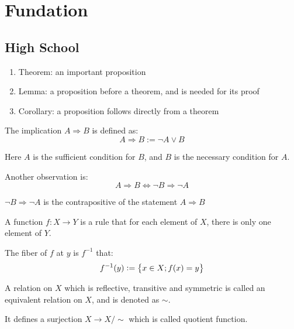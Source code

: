 \chapter{Fundation}

\section{High School}

\begin{enumerate}
    \item Theorem: an important proposition
    \item Lemma: a proposition before a theorem, and is needed for its proof
    \item Corollary: a proposition follows directly from a theorem
\end{enumerate}


\begin{definition}    
The implication $A \Rightarrow B$ is defined as:
\begin{equation}
    A \Rightarrow B := \neg A \vee B
\end{equation}

Here $A$ is the sufficient condition for $B$, and $B$ is the necessary condition for $A$.

Another observation is:
\begin{equation}
    A \Rightarrow B \Leftrightarrow \neg B \Rightarrow \neg A
\end{equation}

$\neg B \Rightarrow \neg A$ is the contrapositive of the statement $A \Rightarrow B$
\end{definition}

\begin{definition}
    A function $f : X \rightarrow Y$ is a rule that for each element of $X$, there is only one element of $Y$.
\end{definition}

\begin{definition}
    The fiber of $f$ at $y$ is $f^{-1}$ that:
    \begin{equation}
        f^{-1}(y) := \set{x \in X; f(x) = y}
    \end{equation}
\end{definition}

\begin{definition}
    A relation on $X$ which is reflective, transitive and symmetric is called an equivalent relation on $X$, and is denoted as $\sim$.
    
    It defines a surjection $X \rightarrow X / \sim$ which is called quotient function.
\end{definition}



